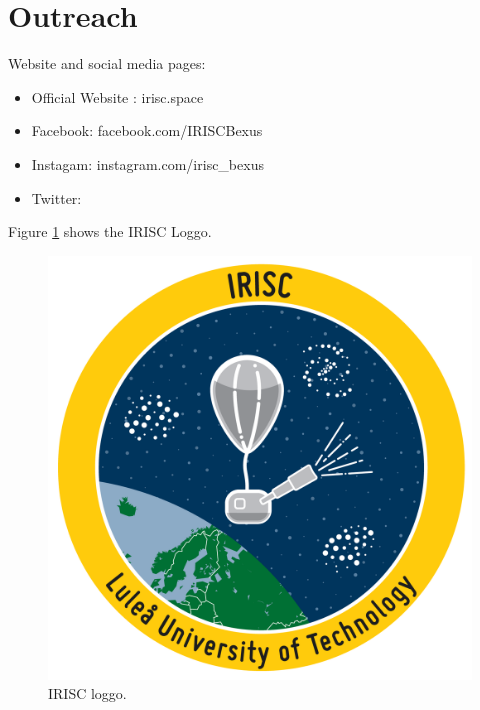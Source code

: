 \newpage
\section{Outreach} \label{sec:appB}

Website and social media pages: 

\begin{itemize}
	\item Official Website : irisc.space
	\item Facebook: facebook.com/IRISCBexus
	\item Instagam: instagram.com/irisc_bexus
	\item Twitter: 
\end{itemize}

Figure \ref{fig:loggo} shows the IRISC Loggo.

\begin{figure}[H]
	\centering
	\includegraphics[width=\textwidth]{0-cover/img/logo-irisc.png}
	\caption{IRISC loggo.}
	\label{fig:loggo}
\end{figure}